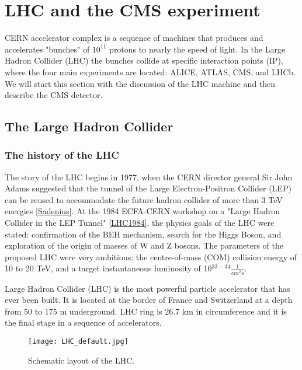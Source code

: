 
\chapter{LHC and the CMS experiment}
\label{ch:cms}
CERN accelerator complex is a sequence of machines that produces and accelerates "bunches" of $10^{11}$ protons to nearly the speed of light. In the Large Hadron Collider (LHC) the bunches collide at specific interaction points (IP), where the four main experiments are located: ALICE, ATLAS, CMS, and LHCb. We will start this section with the discussion of the LHC machine and then describe the CMS detector. 

\section{The Large Hadron Collider}\label{sec:cms_intro}
\subsection{The history of the LHC}

The story of the LHC begins in 1977, when the CERN director general Sir John Adams suggested that the tunnel of the Large Electron-Positron Collider (LEP) can be reused to accommodate the future hadron collider of more than 3 TeV energies \ref{Sadenius}. At the 1984 ECFA-CERN workshop on a "Large Hadron Collider in the LEP Tunnel" \ref{LHC1984}, the physics goals of the LHC were stated: confirmation of the BEH mechanism, search for the Higgs Boson, and exploration of the origin of masses of W and Z bosons. The parameters of the proposed LHC were very ambitious: the centre-of-mass (COM) collision energy of 10 to 20 TeV, and a target instantaneous luminosity of 10$^{33-34}\frac{1}{cm^{2}s}$. 

Large Hadron Collider (LHC) is the most powerful particle accelerator that has ever been built. It is located at the border of France and Switzerland at a depth from 50 to 175 m underground. LHC ring is 26.7 km in circumference and it is the final stage in a sequence of accelerators. 


\begin{figure}[H]
  \centering
  \texttt{[image: LHC\_default.jpg]}
  \caption {Schematic layout of the LHC.}
  \label{lhcmap}
\end{figure}



